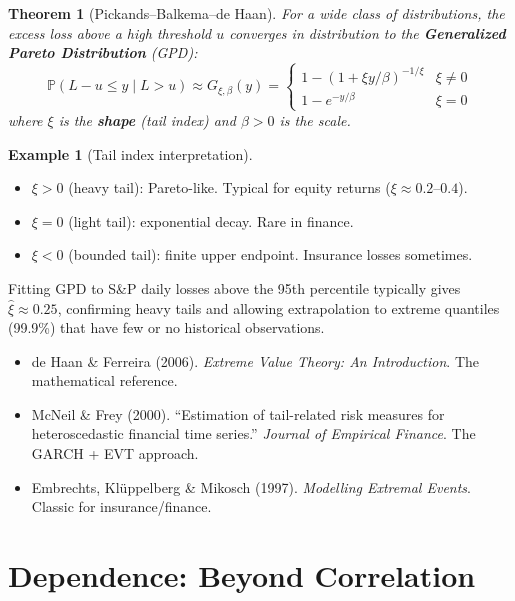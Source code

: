 \documentclass[11pt, a4paper]{article}
\theoremstyle{definition}
\newtheorem{example}{Example}[section]
\theoremstyle{plain}
\newtheorem{theorem}{Theorem}[section]
\theoremstyle{remark}
\newcommand{\PV}{\mathbb{P}}
\begin{document}
\begin{theorem}[Pickands--Balkema--de Haan]
For a wide class of distributions, the excess loss above a high threshold $u$ converges in distribution to the \textbf{Generalized Pareto Distribution} (GPD):
\[
    \PV(L - u \leq y \mid L > u) \approx G_{\xi, \beta}(y) =
    \begin{cases}
        1 - (1 + \xi y / \beta)^{-1/\xi} & \xi \neq 0 \\
        1 - e^{-y/\beta} & \xi = 0
    \end{cases}
\]
where $\xi$ is the \textbf{shape} (tail index) and $\beta > 0$ is the scale.
\end{theorem}

\begin{example}[Tail index interpretation]
\begin{itemize}
    \item $\xi > 0$ (heavy tail): Pareto-like. Typical for equity returns ($\xi \approx 0.2$--$0.4$).
    \item $\xi = 0$ (light tail): exponential decay. Rare in finance.
    \item $\xi < 0$ (bounded tail): finite upper endpoint. Insurance losses sometimes.
\end{itemize}
Fitting GPD to S\&P daily losses above the 95th percentile typically gives $\hat\xi \approx 0.25$, confirming heavy tails and allowing extrapolation to extreme quantiles (99.9\%) that have few or no historical observations.
\end{example}

\begin{refbox}
\begin{itemize}
    \item de Haan \& Ferreira (2006). \emph{Extreme Value Theory: An Introduction}. The mathematical reference.
    \item McNeil \& Frey (2000). ``Estimation of tail-related risk measures for heteroscedastic financial time series.'' \emph{Journal of Empirical Finance}. The GARCH + EVT approach.
    \item Embrechts, Kl\"uppelberg \& Mikosch (1997). \emph{Modelling Extremal Events}. Classic for insurance/finance.
\end{itemize}
\end{refbox}

\section{Dependence: Beyond Correlation}
\end{document}
